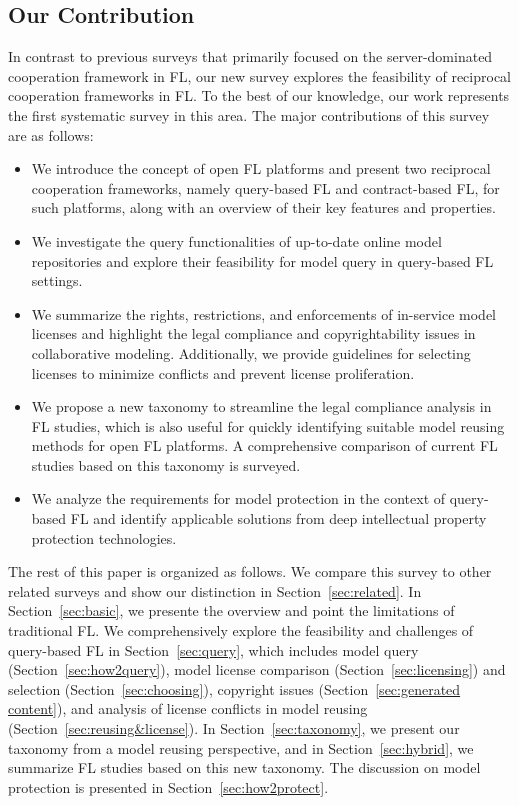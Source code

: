 \subsection{Our Contribution}
  In contrast to previous surveys that primarily focused on the server-dominated cooperation framework in FL,  our new survey explores the feasibility of reciprocal cooperation frameworks in FL.
  To the best of our knowledge, our work represents the first systematic survey in this area.
  The major contributions of this survey are as follows:
  \begin{itemize}
      \item We introduce the concept of open FL platforms and present two reciprocal cooperation frameworks, namely query-based FL and contract-based FL, for such platforms, along with an overview of their key features and properties.
      \item We investigate the query functionalities of up-to-date online model repositories and explore their feasibility for model query in query-based FL settings.
      \item We summarize the rights, restrictions, and enforcements of in-service model licenses and highlight the legal compliance and copyrightability issues in collaborative modeling. Additionally, we provide guidelines for selecting licenses to minimize conflicts and prevent license proliferation.
      \item We propose a new taxonomy to streamline the legal compliance analysis in FL studies, which is also useful for quickly identifying suitable model reusing methods for open FL platforms. A comprehensive comparison of current FL studies based on this taxonomy is surveyed.
      \item We analyze the requirements for model protection in the context of query-based FL and identify applicable solutions from deep intellectual property protection technologies.
\end{itemize}
  
The rest of this paper is organized as follows. 
We compare this survey to other related surveys and show our distinction in Section~\ref{sec:related}. 
In Section~\ref{sec:basic}, we presente the overview and point the limitations of traditional FL.
We comprehensively explore the feasibility and challenges of query-based FL in Section~\ref{sec:query}, which includes model query (Section~\ref{sec:how2query}), model license comparison (Section~\ref{sec:licensing}) and selection (Section~\ref{sec:choosing}), copyright issues (Section~\ref{sec:generated content}), and analysis of license conflicts in model reusing (Section~\ref{sec:reusing&license}).
In Section~\ref{sec:taxonomy}, we present our taxonomy from a model reusing perspective, and in Section~\ref{sec:hybrid}, we summarize FL studies based on this new taxonomy.
The discussion on model protection is presented in Section~\ref{sec:how2protect}.


